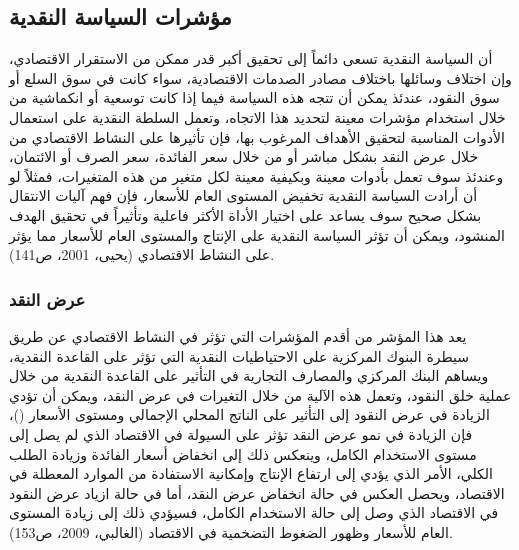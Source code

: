 \documentclass[10pt,a4paper]{report}
\begin{document}
\begin{doublespacing}
\subsection{مؤشرات السياسة النقدية}
أن السياسة النقدية تسعى دائماً إلى تحقيق أكبر قدر ممكن من الاستقرار الاقتصادي، وإن اختلاف وسائلها باختلاف مصادر الصدمات الاقتصادية، سواء كانت في سوق السلع أو سوق النقود، عندئذ يمكن أن تتجه هذه السياسة فيما إذا كانت توسعية أو انكماشية من خلال استخدام مؤشرات معينة لتحديد هذا الاتجاه، وتعمل السلطة النقدية على استعمال الأدوات المناسبة لتحقيق الأهداف المرغوب بها، فإن تأثيرها على النشاط الاقتصادي من خلال عرض النقد بشكل مباشر أو من خلال سعر الفائدة، سعر الصرف أو الائتمان، وعندئذ سوف تعمل بأدوات معينة وبكيفية معينة لكل متغير من هذه المتغيرات، فمثلاً لو أن أرادت السياسة النقدية تخفيض المستوى العام للأسعار، فإن فهم آليات الانتقال بشكل صحيح سوف يساعد على اختيار الأداة الأكثر فاعلية وتأثيراً في تحقيق الهدف المنشود، ويمكن أن تؤثر السياسة النقدية على الإنتاج والمستوى العام للأسعار مما يؤثر على النشاط الاقتصادي ({يحيى، 2001، ص141}).
\subsubsection{عرض النقد}
يعد هذا المؤشر من أقدم المؤشرات التي تؤثر في النشاط الاقتصادي عن طريق سيطرة البنوك المركزية على الاحتياطيات النقدية التي تؤثر على القاعدة النقدية، ويساهم البنك المركزي والمصارف التجارية في التأثير على القاعدة النقدية من خلال عملية خلق النقود، وتعمل هذه الآلية من خلال التغيرات في عرض النقد، ويمكن أن تؤدي الزيادة في عرض النقود إلى التأثير على الناتج المحلي الإجمالي ومستوى الأسعار ()، فإن الزيادة في نمو عرض النقد تؤثر على السيولة في الاقتصاد الذي لم يصل إلى مستوى الاستخدام الكامل، وينعكس ذلك إلى انخفاض أسعار الفائدة وزيادة الطلب الكلي، الأمر الذي يؤدي إلى ارتفاع الإنتاج وإمكانية الاستفادة من الموارد المعطلة في الاقتصاد، ويحصل العكس في حالة انخفاض عرض النقد، أما في حالة ازياد عرض النقود في الاقتصاد الذي وصل إلى حالة الاستخدام الكامل، فسيؤدي ذلك إلى زيادة المستوى العام للأسعار وظهور الضغوط التضخمية في الاقتصاد ({الغالبي، 2009، ص153}).

\end{doublespacing}
\end{document}
